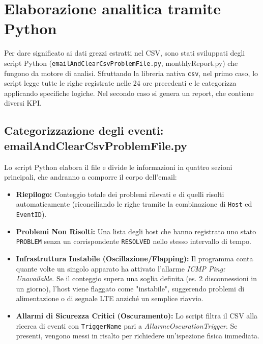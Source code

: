 \documentclass[12pt, a4paper]{report}
\begin{document}
\section{Elaborazione analitica tramite Python}
Per dare significato ai dati grezzi estratti nel CSV, sono stati sviluppati degli script Python 
(\texttt{emailAndClearCsvProblemFile.py}, monthlyReport.py) che fungono da motore di analisi. 
Sfruttando la libreria nativa \texttt{csv}, nel primo caso, 
lo script legge tutte le righe registrate nelle 24 ore precedenti e le categorizza applicando specifiche logiche. 
Nel secondo caso si genera un report, che contiene diversi KPI.

\subsection{Categorizzazione degli eventi: emailAndClearCsvProblemFile.py}
Lo script Python elabora il file e divide le informazioni in quattro sezioni principali, che andranno a comporre il corpo dell'email:
\begin{itemize}
\item \textbf{Riepilogo:} Conteggio totale dei problemi rilevati e di quelli risolti automaticamente
 (riconciliando le righe tramite la combinazione di \texttt{Host} ed \texttt{EventID}).
\item \textbf{Problemi Non Risolti:} Una lista degli host che hanno registrato uno stato 
\texttt{PROBLEM} senza un corrispondente \texttt{RESOLVED} nello stesso intervallo di tempo.
\item \textbf{Infrastruttura Instabile (Oscillazione/Flapping):} Il programma conta quante volte un singolo apparato 
ha attivato l'allarme \textit{ICMP Ping: Unavailable}. 
Se il conteggio supera una soglia definita (es. 2 disconnessioni in un giorno), 
l'host viene flaggato come "instabile", suggerendo problemi di alimentazione o di segnale LTE anziché un semplice riavvio.
\item \textbf{Allarmi di Sicurezza Critici (Oscuramento):} Lo script filtra il CSV alla ricerca di eventi con 
\texttt{TriggerName} pari a \textit{AllarmeOscurationTrigger}. 
Se presenti, vengono messi in risalto per richiedere un'ispezione fisica immediata.
\end{itemize}
\end{document}
